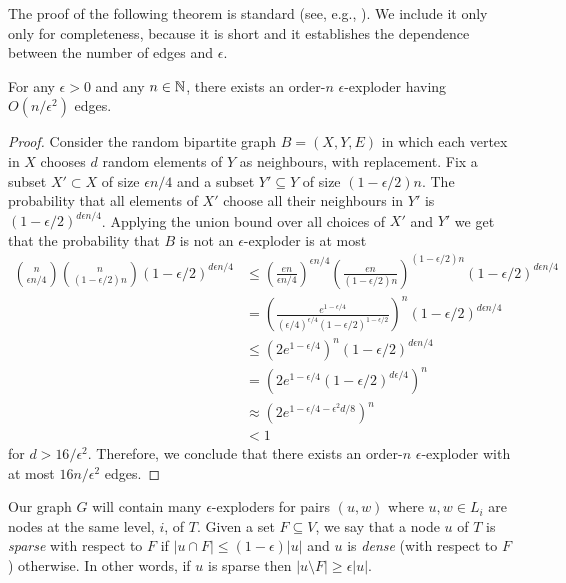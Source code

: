 \documentclass{patmorin}
\begin{document}
The proof of the following theorem is standard (see, e.g.,
\cite[Lemma~1.9]{hoory.linial.wigderson:expanders}).  We include it
only only for completeness, because it is short and it establishes the
dependence between the number of edges and $\epsilon$.

\begin{thm}
   For any $\epsilon >0$ and any $n\in\mathbb{N}$, there exists
   an order-$n$ $\epsilon$-exploder having $O(n/\epsilon^2)$ edges.
\end{thm}

\begin{proof}
   Consider the random bipartite graph $B=(X,Y,E)$ in which each
   vertex in $X$ chooses $d$ random elements of $Y$ as neighbours, with
   replacement.  Fix a subset $X'\subset X$ of size $\epsilon n/4$ and
   a subset $Y'\subseteq Y$ of size $(1-\epsilon/2)n$.  The probability
   that all elements of $X'$ choose all their neighbours in $Y'$ is
   $(1-\epsilon/2)^{d\epsilon n/4}$.  Applying the union bound over
   all choices of $X'$ and $Y'$ we get that the probability that $B$
   is not an $\epsilon$-exploder is at most
  \begin{align*}
    \binom{n}{\epsilon n/4}\binom{n}{(1-\epsilon/2) n}(1-\epsilon/2)^{d\epsilon n/4} & 
    \le \left(\frac{en}{\epsilon n/4}\right)^{\epsilon n/4}
        \left(\frac{en}{(1-\epsilon/2)n}\right)^{(1-\epsilon/2)n}
              (1-\epsilon/2)^{d\epsilon n/4} \\
    & = \left(\frac{e^{1-\epsilon/4}}{(\epsilon /4)^{\epsilon/4}(1-\epsilon/2)^{1-\epsilon/2}}\right)^{n}
              (1-\epsilon/2)^{d\epsilon n/4} \\
    & \le \left(2e^{1-\epsilon/4}\right)^{n}
              (1-\epsilon/2)^{d\epsilon n/4} \\
    & = \left(2e^{1-\epsilon/4}(1-\epsilon/2)^{d\epsilon /4}\right)^{n} \\
    & \approx \left(2e^{1-\epsilon/4-\epsilon^2d/8}\right)^{n} \\
    & < 1
  \end{align*}
  for $d>16/\epsilon^2$.  Therefore, we conclude that there exists an order-$n$ $\epsilon$-exploder with at most $16n/\epsilon^2$ edges.
\end{proof}

Our graph $G$ will contain many $\epsilon$-exploders for pairs $(u,w)$
where $u,w\in L_i$ are nodes at the same level, $i$, of $T$.  Given a
set $F\subseteq V$, we say that a node $u$ of $T$ is \emph{sparse}
with respect to $F$ if $|u\cap F| \le (1-\epsilon)|u|$ and $u$ is
\emph{dense} (with respect to $F$) otherwise.  In other words, if $u$
is sparse then $|u\setminus F| \ge \epsilon |u|$.
\end{document}
